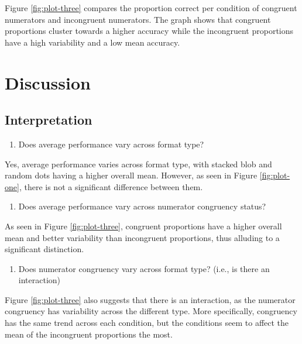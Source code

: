 \documentclass[
  man,floatsintext]{apa6}
\providecommand{\tightlist}{%
  \setlength{\itemsep}{0pt}\setlength{\parskip}{0pt}}
\begin{document}
Figure \ref{fig:plot-three} compares the proportion correct per condition of congruent numerators and incongruent numerators. The graph shows that congruent proportions cluster towards a higher accuracy while the incongruent proportions have a high variability and a low mean accuracy.

\section{Discussion}\label{discussion}

\subsection{Interpretation}\label{interpretation}

\begin{enumerate}
\def\labelenumi{\arabic{enumi}.}
\tightlist
\item
  Does average performance vary across format type?
\end{enumerate}

Yes, average performance varies across format type, with stacked blob and random dots having a higher overall mean. However, as seen in Figure \ref{fig:plot-one}, there is not a significant difference between them.

\begin{enumerate}
\def\labelenumi{\arabic{enumi}.}
\setcounter{enumi}{1}
\tightlist
\item
  Does average performance vary across numerator congruency status?
\end{enumerate}

As seen in Figure \ref{fig:plot-three}, congruent proportions have a higher overall mean and better variability than incongruent proportions, thus alluding to a significant distinction.

\begin{enumerate}
\def\labelenumi{\arabic{enumi}.}
\setcounter{enumi}{2}
\tightlist
\item
  Does numerator congruency vary across format type? (i.e., is there an interaction)
\end{enumerate}

Figure \ref{fig:plot-three} also suggests that there is an interaction, as the numerator congruency has variability across the different type. More specifically, congruency has the same trend across each condition, but the conditions seem to affect the mean of the incongruent proportions the most.
\end{document}
